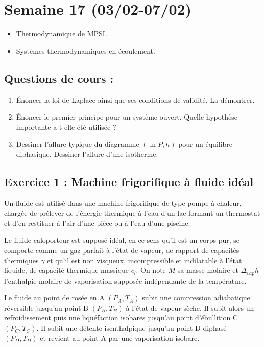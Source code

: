 \section{Semaine 17 (03/02-07/02) }

\begin{itemize}
	\item Thermodynamique de MPSI.
	\item Systèmes thermodynamiques en écoulement.
\end{itemize}

\subsection{Questions de cours :}
\begin{enumerate}
	\item Énoncer la loi de Laplace ainsi que ses conditions de validité. La démontrer.
	\item Énoncer le premier principe pour un système ouvert. Quelle hypothèse importante a-t-elle été utilisée ?
	\item Dessiner l'allure typique du diagramme $(\ln P, h)$ pour un équilibre diphasique. Dessiner l'allure d'une isotherme. 
\end{enumerate}

\subsection{Exercice 1 : Machine frigorifique à fluide idéal}

Un fluide est utilisé dans une machine frigorifique de type pompe à chaleur, chargée de prélever de l'énergie thermique à l'eau d'un lac formant un thermostat et d'en restituer à l'air d'une pièce ou à l'eau d'une piscine.

Le fluide caloporteur est supposé idéal, en ce sens qu'il est un corps pur, se comporte comme un gaz parfait à l'état de vapeur, de rapport de capacités thermiques $\gamma$ et qu'il est non visqueux, incompressible et indilatable à l'état liquide, de capacité thermique massique $c_l$. On note $M$ sa masse molaire et $\Delta_{vap}h$ l'enthalpie molaire de vaporisation supposée indépendante de la température. 

Le fluide au point de rosée en A $(P_A, T_A)$ subit une compression adiabatique réversible jusqu'au point B $(P_B, T_B)$ à l'état de vapeur sèche. Il subit alors un refroidissement puis une liquéfaction isobares jusqu'au point d'ébullition C $(P_C, T_C)$. Il subit une détente isenthalpique jusqu'au point D diphasé $(P_D, T_D)$ et revient au point A par une vaporisation isobare.


